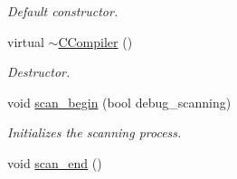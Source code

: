 \begin{DoxyCompactItemize}
\begin{DoxyCompactList}\small\item\em Default constructor. \end{DoxyCompactList}\item 
\hypertarget{classCCompiler_acfb4847b222ee42be0305a28fac628c3}{virtual \hyperlink{classCCompiler_acfb4847b222ee42be0305a28fac628c3}{$\sim$\-C\-Compiler} ()}\label{classCCompiler_acfb4847b222ee42be0305a28fac628c3}

\begin{DoxyCompactList}\small\item\em Destructor. \end{DoxyCompactList}\item 
void \hyperlink{classCCompiler_a52d92c3695f753176bfb14cbf544f398}{scan\-\_\-begin} (bool debug\-\_\-scanning)
\begin{DoxyCompactList}\small\item\em Initializes the scanning process. \end{DoxyCompactList}\item 
\hypertarget{classCCompiler_a304e3789eb84bfa2a2e2ef21f84abf12}{void \hyperlink{classCCompiler_a304e3789eb84bfa2a2e2ef21f84abf12}{scan\-\_\-end} ()}\label{classCCompiler_a304e3789eb84bfa2a2e2ef21f84abf12}


\end{DoxyCompactItemize}
